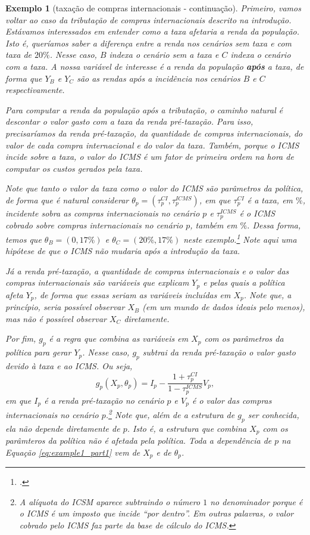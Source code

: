 \documentclass[12pt]{article}
\theoremstyle{break}
\newtheorem{exemplo}{Exemplo}
\begin{document}
\begin{exemplo}[taxação de compras internacionais - continuação]
\label{ex:ci_taxation}
Primeiro, vamos voltar ao caso da tributação de compras internacionais descrito na introdução. Estávamos interessados em entender como a taxa afetaria a renda da população. Isto é, queríamos saber a diferença entre a renda nos cenários sem taxa e com taxa de $20\%$. Nesse caso, $B$ indexa o cenário sem a taxa e $C$ indexa o cenário com a taxa. A nossa variável de interesse é a renda da população \textbf{após} a taxa, de forma que $Y_B$ e $Y_C$ são as rendas após a incidência nos cenários $B$ e $C$ respectivamente. 

Para computar a renda da população após a tributação, o caminho natural é descontar o valor gasto com a taxa da renda pré-taxação. Para isso, precisaríamos da renda pré-taxação, da quantidade de compras internacionais, do valor de cada compra internacional e do valor da taxa. Também, porque o ICMS incide sobre a taxa, o valor do ICMS é um fator de primeira ordem na hora de computar os custos gerados pela taxa. 

Note que tanto o valor da taxa como o valor do ICMS são parâmetros da política, de forma que é natural considerar $\theta_p=(\tau^{CI}_p, \tau^{ICMS}_p)$, em que $\tau^{CI}_p$ é a taxa, em $\%$, incidente sobra as compras internacionais no cenário $p$ e $\tau^{ICMS}_p$ é o ICMS cobrado sobre compras internacionais no cenário $p$, também em $\%$. Dessa forma, temos que $\theta_B=(0, 17\%)$ e $\theta_C=(20\%, 17\%)$ neste exemplo.\footnote{\textcite{folha_remessas}.} Note aqui uma hipótese de que o ICMS não mudaria após a introdução da taxa. 

Já a renda pré-taxação, a quantidade de compras internacionais e o valor das compras internacionais são variáveis que explicam $Y_p$ e pelas quais a política afeta $Y_p$, de forma que essas seriam as variáveis incluídas em $X_p$. Note que, a princípio, seria possível observar $X_B$ (em um mundo de dados ideais pelo menos), mas não é possível observar $X_C$ diretamente. 

Por fim, $g_p$ é a regra que combina as variáveis em $X_p$ com os parâmetros da política para gerar $Y_p$. Nesse caso, $g_p$ subtrai da renda pré-taxação o valor gasto devido à taxa e ao ICMS. Ou seja, 
\begin{equation}
\label{eq:example1_part1}
g_p(X_p, \theta_p)=I_p - \frac{1+\tau^{CI}_p}{1-\tau^{ICMS}_p}V_p, 
\end{equation}
em que $I_p$ é a renda pré-taxação no cenário $p$ e $V_p$ é o valor das compras internacionais no cenário $p$.\footnote{A alíquota do ICSM aparece subtraindo o número $1$ no denominador porque é o ICMS é um imposto que incide ``por dentro''. Em outras palavras, o valor cobrado pelo ICMS faz parte da base de cálculo do ICMS.} Note que, além de a estrutura de $g_p$ ser conhecida, ela não depende diretamente de $p$. Isto é, a estrutura que combina $X_p$ com os parâmteros da política não é afetada pela política. Toda a dependência de $p$ na Equação \eqref{eq:example1_part1} vem de $X_p$ e de $\theta_p$. 


\end{exemplo}
\end{document}
